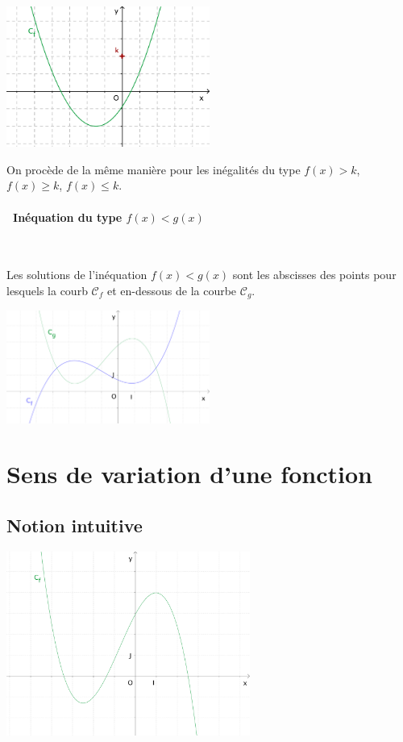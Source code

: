\medskip

{\centering
\includegraphics[width=0.5\textwidth]{F_resineq_f}
\par}

\medskip

On procède de la même manière pour les inégalités du type $f(x)>k$,
$f(x)\geq k$, $f(x)\leq k$. 

\paragraph{\textbullet \ Inéquation du type $f(x)<g(x)$} \ \par
Les solutions de l'inéquation $f(x)<g(x)$ sont les abscisses des
points pour lesquels la courb $\mathscr{C}_f$ et en-dessous de la
courbe $\mathscr{C}_g$.

\medskip

{\centering
  \includegraphics[width=0.5\textwidth]{F_resineq_fg}
\par}



\section{Sens de variation d'une fonction}
\label{sec:variations}

\subsection{Notion intuitive}
\label{ssec:notion_intuitive}

\vspace{2cm}

\begin{center}
  \includegraphics[width=0.6\textwidth]{F_Variations}
\end{center}

